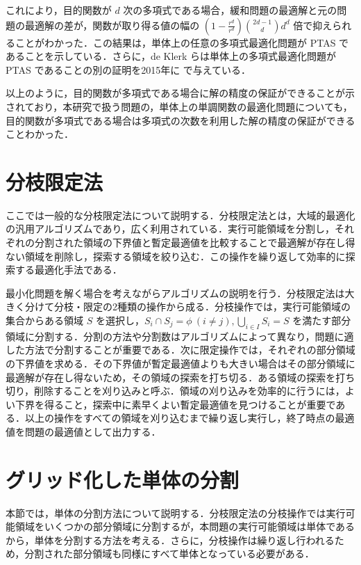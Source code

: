 \documentclass[a4paper,11pt]{jreport}
\begin{document}
これにより，目的関数が $ d $ 次の多項式である場合，緩和問題の最適解と元の問題の最適解の差が，関数が取り得る値の幅の $ \left( 1 - \frac{r^{\underline{d}}}{r^d} \right) \binom{2d - 1}{d} d^d $ 倍で抑えられることがわかった．この結果は，単体上の任意の多項式最適化問題が PTAS であることを示している．さらに，de Klerk らは単体上の多項式最適化問題が PTAS であることの別の証明を2015年に \cite{deklerk_alternative} で与えている．\par
以上のように，目的関数が多項式である場合に解の精度の保証ができることが示されており，本研究で扱う問題の，単体上の単調関数の最適化問題についても，目的関数が多項式である場合は多項式の次数を利用した解の精度の保証ができることわかった．\par

\section{分枝限定法} \label{sec:bnb}

ここでは一般的な分枝限定法について説明する．分枝限定法とは，大域的最適化の汎用アルゴリズムであり，広く利用されている．実行可能領域を分割し，それぞれの分割された領域の下界値と暫定最適値を比較することで最適解が存在し得ない領域を削除し，探索する領域を絞り込む．この操作を繰り返して効率的に探索する最適化手法である．\par
最小化問題を解く場合を考えながらアルゴリズムの説明を行う．分枝限定法は大きく分けて分枝・限定の2種類の操作から成る．分枝操作では，実行可能領域の集合からある領域 $ S $ を選択し，$ S_i \cap S_j = \phi \: (i \neq j), \bigcup_{i \in I} S_i = S $ を満たす部分領域に分割する．分割の方法や分割数はアルゴリズムによって異なり，問題に適した方法で分割することが重要である．次に限定操作では，それぞれの部分領域の下界値を求める．その下界値が暫定最適値よりも大きい場合はその部分領域に最適解が存在し得ないため，その領域の探索を打ち切る．ある領域の探索を打ち切り，削除することを刈り込みと呼ぶ．領域の刈り込みを効率的に行うには，よい下界を得ること，探索中に素早くよい暫定最適値を見つけることが重要である．以上の操作をすべての領域を刈り込むまで繰り返し実行し，終了時点の最適値を問題の最適値として出力する．\par

\section{グリッド化した単体の分割} \label{sec:partition}

本節では，単体の分割方法について説明する．分枝限定法の分枝操作では実行可能領域をいくつかの部分領域に分割するが，本問題の実行可能領域は単体であるから，単体を分割する方法を考える．さらに，分枝操作は繰り返し行われるため，分割された部分領域も同様にすべて単体となっている必要がある．\par
\end{document}

